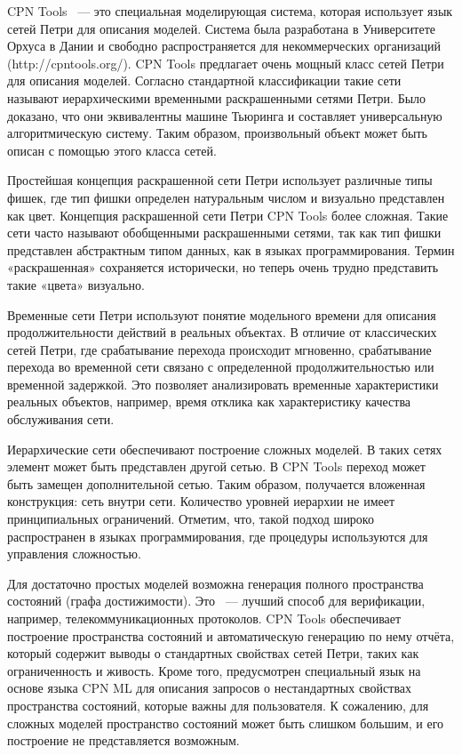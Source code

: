 CPN Tools ~--- это специальная моделирующая система, которая использует язык сетей Петри для описания моделей. Система была разработана в Университете Орхуса в Дании и свободно распространяется для некоммерческих организаций (http://cpntools.org/). CPN Tools предлагает очень мощный класс сетей Петри для описания моделей. Согласно стандартной классификации такие сети называют иерархическими временными раскрашенными сетями Петри. Было доказано, что они эквивалентны машине Тьюринга и составляет универсальную алгоритмическую систему. Таким образом, произвольный объект может быть описан с помощью этого класса сетей.

Простейшая концепция раскрашенной сети Петри использует различные типы фишек, где тип фишки определен натуральным числом и визуально представлен как цвет. Концепция раскрашенной сети Петри CPN Tools более сложная. Такие сети часто называют обобщенными раскрашенными сетями, так как тип фишки представлен абстрактным типом данных, как в языках программирования. Термин «раскрашенная» сохраняется исторически, но теперь очень трудно представить такие «цвета» визуально.

Временные сети Петри используют понятие модельного времени для описания продолжительности действий в реальных объектах. В отличие от классических сетей Петри, где срабатывание перехода происходит мгновенно, срабатывание перехода во временной сети связано с определенной продолжительностью или временной задержкой. Это позволяет анализировать временные характеристики реальных объектов, например, время отклика как характеристику качества обслуживания сети.

Иерархические сети обеспечивают построение сложных моделей. В таких сетях элемент может быть представлен другой сетью. В CPN Tools переход может быть замещен дополнительной сетью. Таким образом, получается вложенная конструкция: сеть внутри сети. Количество уровней иерархии не имеет принципиальных ограничений. Отметим, что, такой подход широко распространен в языках программирования, где процедуры используются для управления сложностью.

Для достаточно простых моделей возможна генерация полного пространства состояний (графа достижимости). Это ~--- лучший способ для верификации, например, телекоммуникационных протоколов. CPN Tools обеспечивает построение пространства состояний и автоматическую генерацию по нему отчёта, который содержит выводы о стандартных свойствах сетей Петри, таких как ограниченность и живость. Кроме того, предусмотрен специальный язык на основе языка CPN ML для описания запросов о
нестандартных свойствах пространства состояний, которые важны для пользователя. К сожалению, для сложных моделей пространство состояний может быть слишком большим, и его построение не представляется возможным.

